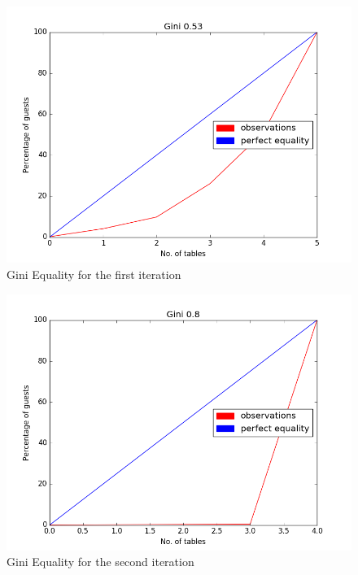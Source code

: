 \documentclass{WeSTassignment}
\begin{document}
\begin{figure}[h]
  \centering
  \includegraphics[scale = 0.5]{gini1.png}
   \caption{Gini Equality for the first iteration}
     \label{fig:dig} 
\end{figure}

\begin{figure}[h]
  \centering
  \includegraphics[scale = 0.5]{gini2.png}
   \caption{Gini Equality for the second iteration}
     \label{fig:dig} 
\end{figure}
\end{document}
